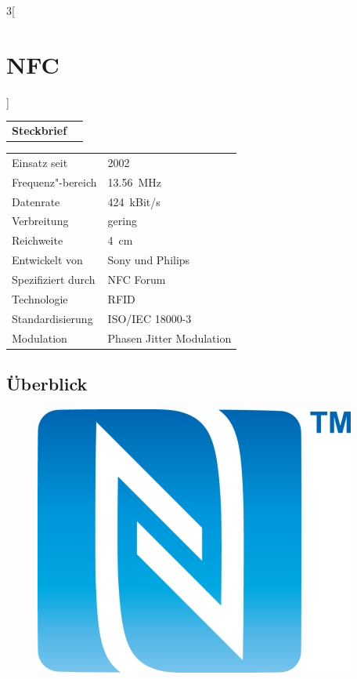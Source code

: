 \begin{multicols}{3}[\section{NFC}]


\newrefsegment

\begin{tabular}{p{}p{2.7 cm}}
\textbf{Steckbrief}& \\
\end{tabular}
\begin{tabular}{p{}p{2.7 cm}}
\rowcolors{1}{\topicolor!20}{}
      Einsatz seit & 2002\\
      Frequenz"-bereich  & \SI{13.56}{\mega\hertz}\\
      Datenrate & \SI{424}{kBit/s}\\
      Verbreitung & gering\\
      Reichweite & \SI{4}{cm}\\
      Entwickelt von & Sony und Philips \\
      Spezifiziert durch & NFC Forum \\
      Technologie & RFID \\
      Standardisierung & ISO/IEC 18000-3 \\
      Modulation & Phasen Jitter Modulation \\
\end{tabular}
\par


\subsection*{Überblick}
\begin{figure} 
\vspace{-20pt} 
\begin{center} 
\hspace{-20pt} 
\includegraphics[width=0.7\linewidth]{Kapitel/NFC/Grafiken/Logo.jpg} 
\end{center} 
\vspace{-15pt} 
\end{figure} 



\end{multicols}
